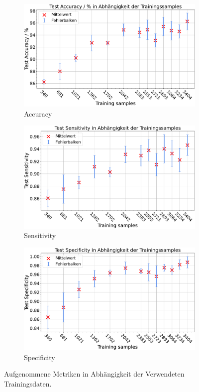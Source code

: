 \begin{figure}[H]
  \centering
  \begin{subfigure}[b]{0.48\textwidth}
    \includegraphics[width=\textwidth]{plots/2-Messungen-noTu-Tu_Accuracy_mean.pdf}
    \caption{Accuracy}
    \label{fig:reduzierung_accuracy}
  \end{subfigure}
  \begin{subfigure}[b]{0.48\textwidth}
    \includegraphics[width=\textwidth]{plots/2-Messungen-noTu-Tu_Sensitivity_mean.pdf}
    \caption{Sensitivity}
    \label{fig:reduzierung_sensitivity}
  \end{subfigure}
  \begin{subfigure}[b]{0.48\textwidth}
    \includegraphics[width=\textwidth]{plots/2-Messungen-noTu-Tu_Specificity_mean.pdf}
    \caption{Specificity}
    \label{fig:reduzierung_specificity}
  \end{subfigure}
  \caption{Aufgenommene Metriken in Abhängigkeit der Verwendeten Trainingsdaten.}
  \label{fig:reduzierung_trainingsdaten}
\end{figure}
